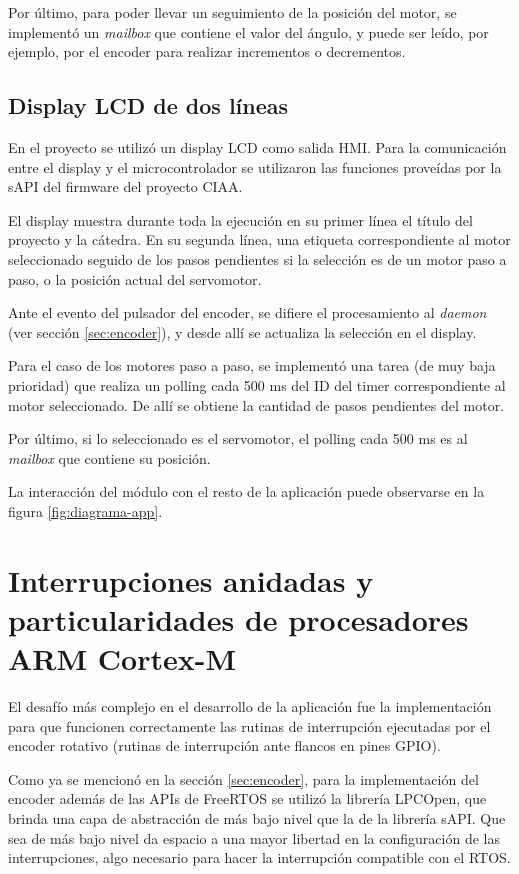 \documentclass{IEEEtran}
\begin{document}
Por último, para poder llevar un seguimiento de la posición del motor, se implementó un \textit{mailbox} que contiene el valor del ángulo, y puede ser leído, por ejemplo, por el encoder para realizar incrementos o decrementos.

\subsection{Display LCD de dos líneas}
\label{sec:display}

En el proyecto se utilizó un display LCD como salida HMI. Para la comunicación entre el display y el microcontrolador se utilizaron las funciones proveídas por la sAPI del firmware del proyecto CIAA.

El display muestra durante toda la ejecución en su primer línea el título del proyecto y la cátedra. En su segunda línea, una etiqueta correspondiente al motor seleccionado seguido de los pasos pendientes si la selección es de un motor paso a paso, o la posición actual del servomotor.

Ante el evento del pulsador del encoder, se difiere el procesamiento al \textit{daemon} (ver sección \ref{sec:encoder}), y desde allí se actualiza la selección en el display.

Para el caso de los motores paso a paso, se implementó una tarea (de muy baja prioridad) que realiza un polling cada 500 ms del ID del timer correspondiente al motor seleccionado. De allí se obtiene la cantidad de pasos pendientes del motor.

Por último, si lo seleccionado es el servomotor, el polling cada 500 ms es al \textit{mailbox} que contiene su posición.

La interacción del módulo con el resto de la aplicación puede observarse en la figura \ref{fig:diagrama-app}.

\section{Interrupciones anidadas y particularidades de procesadores ARM Cortex-M}
El desafío más complejo en el desarrollo de la aplicación fue la implementación para que funcionen correctamente las rutinas de interrupción ejecutadas por el encoder rotativo (rutinas de interrupción ante flancos en pines GPIO).

Como ya se mencionó en la sección \ref{sec:encoder}, para la implementación del encoder además de las APIs de FreeRTOS se utilizó la librería LPCOpen, que brinda una capa de abstracción de más bajo nivel que la de la librería sAPI. Que sea de más bajo nivel da espacio a una mayor libertad en la configuración de las interrupciones, algo necesario para hacer la interrupción compatible con el RTOS.
\end{document}
